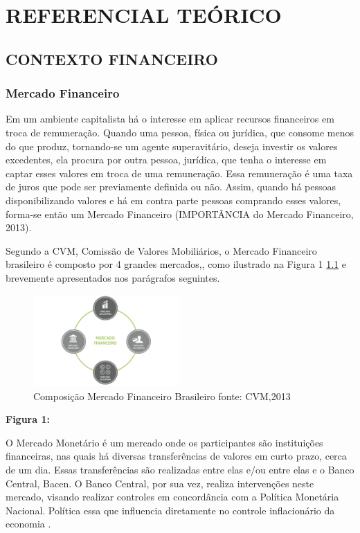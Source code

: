 
\newpage

\chapter[REFERENCIAL TEORICO]{REFERENCIAL TEÓRICO}
\section{CONTEXTO FINANCEIRO}
\subsection{Mercado Financeiro}

Em um ambiente capitalista há o interesse em aplicar recursos financeiros em troca de remuneração. Quando uma pessoa, física ou jurídica, que consome menos do que produz, tornando-se um agente superavitário, deseja investir os valores excedentes, ela procura por outra pessoa, jurídica, que tenha o interesse em captar esses valores em troca de uma remuneração. Essa remuneração é uma taxa de juros que pode ser previamente definida ou não. Assim, quando há pessoas disponibilizando valores e há em contra parte pessoas comprando esses valores, forma-se então um Mercado Financeiro (IMPORTÂNCIA do Mercado Financeiro, 2013).

Segundo a CVM, Comissão de Valores Mobiliários, o Mercado Financeiro brasileiro é composto por 4 grandes mercados,\cite[p. 15]{cmv2014}, como ilustrado na Figura 1 \ref{f01} e brevemente apresentados nos parágrafos seguintes.

\begin{figure}[h]
\centering
\label{f01}
\includegraphics[width=0.5\textwidth]{figuras/f01}
\caption{Composição Mercado Financeiro Brasileiro  \newline fonte: CVM,2013}

\end{figure}

\textbf{Figura 1: }

O Mercado Monetário é um mercado onde os participantes são instituições financeiras, nas quais há diversas transferências de valores em curto prazo, cerca de um dia. Essas transferências são realizadas entre elas e/ou entre elas e o Banco Central, Bacen. O Banco Central, por sua vez, realiza intervenções neste mercado, visando realizar controles em concordância com a Política Monetária Nacional. Política essa que influencia diretamente no controle inflacionário da economia \cite[p. 32]{cmv2014}.


